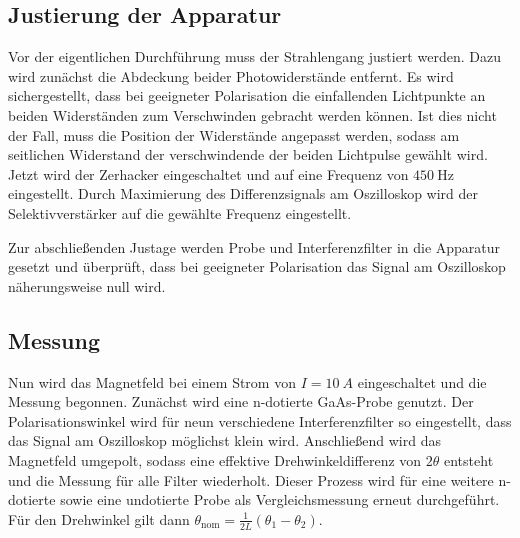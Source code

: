 \subsection{Justierung der Apparatur}

Vor der eigentlichen Durchführung muss der Strahlengang justiert werden.
Dazu wird zunächst die Abdeckung beider Photowiderstände entfernt.
Es wird sichergestellt, dass bei geeigneter Polarisation die einfallenden Lichtpunkte an beiden Widerständen zum Verschwinden gebracht werden können.
Ist dies nicht der Fall, muss die Position der Widerstände angepasst werden, sodass am seitlichen Widerstand der verschwindende der beiden Lichtpulse gewählt wird. \\

Jetzt wird der Zerhacker eingeschaltet und auf eine Frequenz von $\SI{450}{\hertz}$ eingestellt.
Durch Maximierung des Differenzsignals am Oszilloskop wird der Selektivverstärker auf die gewählte Frequenz eingestellt.

Zur abschließenden Justage werden Probe und Interferenzfilter in die Apparatur gesetzt und überprüft, dass bei geeigneter Polarisation das Signal am Oszilloskop
näherungsweise null wird.


\subsection{Messung}

Nun wird das Magnetfeld bei einem Strom von $I = \SI{10}{A}$ eingeschaltet und die Messung begonnen.
Zunächst wird eine n-dotierte GaAs-Probe genutzt.
Der Polarisationswinkel wird für neun verschiedene Interferenzfilter so eingestellt, dass das Signal am Oszilloskop möglichst klein wird.
Anschließend wird das Magnetfeld umgepolt, sodass eine effektive Drehwinkeldifferenz von $2\theta$ entsteht und die Messung für alle Filter wiederholt.
Dieser Prozess wird für eine weitere n-dotierte sowie eine undotierte Probe als Vergleichsmessung erneut durchgeführt. \\

Für den Drehwinkel gilt dann $\theta_\text{nom} = \frac{1}{2  L} (\theta_1 - \theta_2)$.